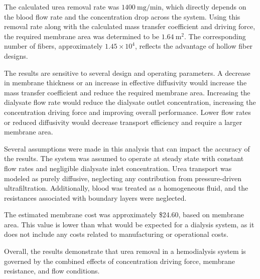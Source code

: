 \documentclass[10.5pt]{article}
\begin{document}
\vspace{0.3cm}


The calculated urea removal rate was $1400 \ \text{mg/min}$, which directly depends on the blood flow rate and the concentration drop across the system. Using this removal rate along with the calculated mass transfer coefficient and driving force, the required membrane area was determined to be $1.64 \ \text{m}^2$. The corresponding number of fibers, approximately $1.45 \times 10^4$, reflects the advantage of hollow fiber designs.

\vspace{0.3cm}


The results are sensitive to several design and operating parameters. A decrease in membrane thickness or an increase in effective diffusivity would increase the mass transfer coefficient and reduce the required membrane area. Increasing the dialysate flow rate would reduce the dialysate outlet concentration, increasing the concentration driving force and improving overall performance. Lower flow rates or reduced diffusivity would decrease transport efficiency and require a larger membrane area.

\vspace{0.3cm}


Several assumptions were made in this analysis that can impact the accuracy of the results. The system was assumed to operate at steady state with constant flow rates and negligible dialysate inlet concentration. Urea transport was modeled as purely diffusive, neglecting any contribution from pressure-driven ultrafiltration. Additionally, blood was treated as a homogeneous fluid, and the resistances associated with boundary layers were neglected.

\vspace{0.3cm}


The estimated membrane cost was approximately \$24.60, based on membrane area. This value is lower than what would be expected for a dialysis system, as it does not include any costs related to manufacturing or operational costs.

\vspace{0.3cm}


Overall, the results demonstrate that urea removal in a hemodialysis system is governed by the combined effects of concentration driving force, membrane resistance, and flow conditions.

\vspace{0.3cm}
\end{document}

